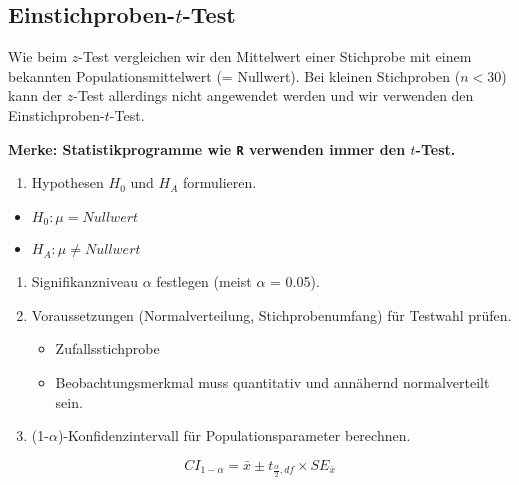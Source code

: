 \documentclass[
]{book}
\providecommand{\tightlist}{%
  \setlength{\itemsep}{0pt}\setlength{\parskip}{0pt}}
\begin{document}
\hypertarget{einstichproben-t-test}{%
\subsection{\texorpdfstring{Einstichproben-\(t\)-Test}{Einstichproben-t-Test}}\label{einstichproben-t-test}}

Wie beim \(z\)-Test vergleichen wir den Mittelwert einer Stichprobe mit einem bekannten Populationsmittelwert (= Nullwert). Bei kleinen Stichproben (\(n < 30\)) kann der \(z\)-Test allerdings nicht angewendet werden und wir verwenden den Einstichproben-\(t\)-Test.

\textbf{Merke: Statistikprogramme wie \texttt{R} verwenden immer den \(t\)-Test.}

\begin{enumerate}
\def\labelenumi{\arabic{enumi}.}
\tightlist
\item
  Hypothesen \(H_0\) und \(H_A\) formulieren.
\end{enumerate}

\begin{itemize}
\tightlist
\item
  \(H_0: \mu = Nullwert\)\\
\item
  \(H_A: \mu \neq Nullwert\)
\end{itemize}

\begin{enumerate}
\def\labelenumi{\arabic{enumi}.}
\setcounter{enumi}{1}
\item
  Signifikanzniveau \(\alpha\) festlegen (meist \(\alpha\) = 0.05).
\item
  Voraussetzungen (Normalverteilung, Stichprobenumfang) für Testwahl prüfen.

  \begin{itemize}
  \tightlist
  \item
    Zufallsstichprobe\\
  \item
    Beobachtungsmerkmal muss quantitativ und annähernd normalverteilt sein.
  \end{itemize}
\item
  (1-\(\alpha\))-Konfidenzintervall für Populationsparameter berechnen.
\end{enumerate}

\begin{equation}
  CI_{1-\alpha} = \bar{x} \pm t_{\frac{\alpha}{2},df} \times SE_{\bar{x}}
  \label{eq:CI-ttest}
\end{equation}
\end{document}
